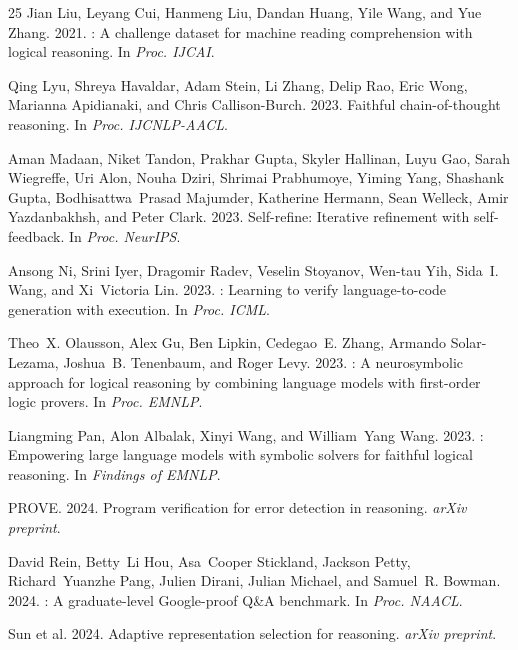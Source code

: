 \documentclass[11pt,a4paper]{article}
\begin{document}
\begin{thebibliography}{25}
Jian Liu, Leyang Cui, Hanmeng Liu, Dandan Huang, Yile Wang, and Yue Zhang. 2021.
: A challenge dataset for machine reading comprehension with logical reasoning.
\newblock In \emph{Proc. IJCAI}.

Qing Lyu, Shreya Havaldar, Adam Stein, Li Zhang, Delip Rao, Eric Wong, Marianna Apidianaki, and Chris Callison-Burch. 2023.
\newblock Faithful chain-of-thought reasoning.
\newblock In \emph{Proc. IJCNLP-AACL}.

Aman Madaan, Niket Tandon, Prakhar Gupta, Skyler Hallinan, Luyu Gao, Sarah Wiegreffe, Uri Alon, Nouha Dziri, Shrimai Prabhumoye, Yiming Yang, Shashank Gupta, Bodhisattwa~Prasad Majumder, Katherine Hermann, Sean Welleck, Amir Yazdanbakhsh, and Peter Clark. 2023.
\newblock Self-refine: Iterative refinement with self-feedback.
\newblock In \emph{Proc. NeurIPS}.

Ansong Ni, Srini Iyer, Dragomir Radev, Veselin Stoyanov, Wen-tau Yih, Sida~I. Wang, and Xi~Victoria Lin. 2023.
: Learning to verify language-to-code generation with execution.
\newblock In \emph{Proc. ICML}.

Theo~X. Olausson, Alex Gu, Ben Lipkin, Cedegao~E. Zhang, Armando Solar-Lezama, Joshua~B. Tenenbaum, and Roger Levy. 2023.
: A neurosymbolic approach for logical reasoning by combining language models with first-order logic provers.
\newblock In \emph{Proc. EMNLP}.

Liangming Pan, Alon Albalak, Xinyi Wang, and William~Yang Wang. 2023.
: Empowering large language models with symbolic solvers for faithful logical reasoning.
\newblock In \emph{Findings of EMNLP}.

PROVE. 2024.
\newblock Program verification for error detection in reasoning.
\newblock \emph{arXiv preprint}.

David Rein, Betty~Li Hou, Asa~Cooper Stickland, Jackson Petty, Richard~Yuanzhe Pang, Julien Dirani, Julian Michael, and Samuel~R. Bowman. 2024.
: A graduate-level Google-proof Q\&A benchmark.
\newblock In \emph{Proc. NAACL}.

Sun et al. 2024.
\newblock Adaptive representation selection for reasoning.
\newblock \emph{arXiv preprint}.


\end{thebibliography}
\end{document}
